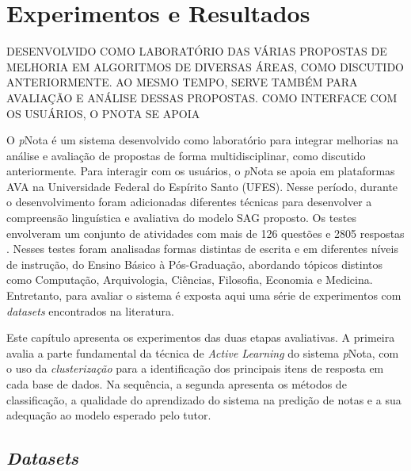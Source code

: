 \chapter{Experimentos e Resultados}
\label{cap-experimentos}

DESENVOLVIDO COMO LABORATÓRIO DAS VÁRIAS PROPOSTAS DE MELHORIA EM ALGORITMOS DE DIVERSAS ÁREAS, COMO DISCUTIDO ANTERIORMENTE. AO MESMO TEMPO, SERVE TAMBÉM PARA AVALIAÇÃO E ANÁLISE DESSAS PROPOSTAS. COMO INTERFACE COM OS USUÁRIOS, O PNOTA SE APOIA

O \textit{p}Nota é um sistema desenvolvido como laboratório para integrar melhorias na análise e avaliação de propostas de forma multidisciplinar, como discutido anteriormente. Para interagir com os usuários, o \textit{p}Nota se apoia em plataformas AVA na Universidade Federal do Espírito Santo (UFES). Nesse período, durante o desenvolvimento foram adicionadas diferentes técnicas para desenvolver a compreensão linguística e avaliativa do modelo SAG proposto. Os testes envolveram um conjunto de atividades com mais de 126 questões e 2805 respostas \cite{spalenza2016a}. Nesses testes foram analisadas formas distintas de escrita e em diferentes níveis de instrução, do Ensino Básico à Pós-Graduação, abordando tópicos distintos como Computação, Arquivologia, Ciências, Filosofia, Economia e Medicina. Entretanto, para avaliar o sistema é exposta aqui uma série de experimentos com \textit{datasets} encontrados na literatura.

Este capítulo apresenta os experimentos das duas etapas avaliativas. A primeira avalia a parte fundamental da técnica de \textit{Active Learning} do sistema \textit{p}Nota, com o uso da \textit{clusterização} para a identificação dos principais itens de resposta em cada base de dados. Na sequência, a segunda apresenta os métodos de classificação, a qualidade do aprendizado do sistema na predição de notas e a sua adequação ao modelo esperado pelo tutor.

\section{\textit{Datasets}}

